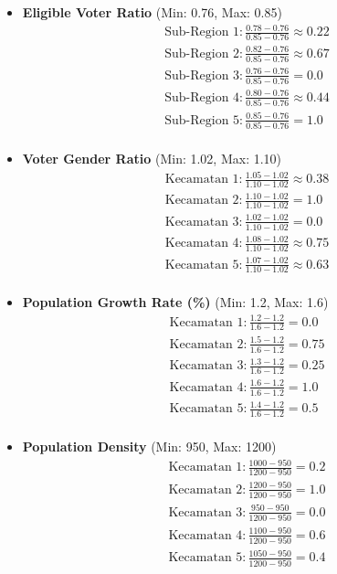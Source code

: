 \begin{itemize}
    \item \textbf{Eligible Voter Ratio} (Min: 0.76, Max: 0.85)
    \begin{align*}
        &\text{Sub-Region 1}: \frac{0.78 - 0.76}{0.85 - 0.76} \approx 0.22 \\
        &\text{Sub-Region 2}: \frac{0.82 - 0.76}{0.85 - 0.76} \approx 0.67 \\
        &\text{Sub-Region 3}: \frac{0.76 - 0.76}{0.85 - 0.76} = 0.0 \\
        &\text{Sub-Region 4}: \frac{0.80 - 0.76}{0.85 - 0.76} \approx 0.44 \\
        &\text{Sub-Region 5}: \frac{0.85 - 0.76}{0.85 - 0.76} = 1.0 \\
    \end{align*}
    
    \item \textbf{Voter Gender Ratio} (Min: 1.02, Max: 1.10)
    \begin{align*}
        &\text{Kecamatan 1}: \frac{1.05 - 1.02}{1.10 - 1.02} \approx 0.38 \\
        &\text{Kecamatan 2}: \frac{1.10 - 1.02}{1.10 - 1.02} = 1.0 \\
        &\text{Kecamatan 3}: \frac{1.02 - 1.02}{1.10 - 1.02} = 0.0 \\
        &\text{Kecamatan 4}: \frac{1.08 - 1.02}{1.10 - 1.02} \approx 0.75 \\
        &\text{Kecamatan 5}: \frac{1.07 - 1.02}{1.10 - 1.02} \approx 0.63 \\
    \end{align*}
    
    \item \textbf{Population Growth Rate (\%)} (Min: 1.2, Max: 1.6)
    \begin{align*}
        &\text{Kecamatan 1}: \frac{1.2 - 1.2}{1.6 - 1.2} = 0.0 \\
        &\text{Kecamatan 2}: \frac{1.5 - 1.2}{1.6 - 1.2} = 0.75 \\
        &\text{Kecamatan 3}: \frac{1.3 - 1.2}{1.6 - 1.2} = 0.25 \\
        &\text{Kecamatan 4}: \frac{1.6 - 1.2}{1.6 - 1.2} = 1.0 \\
        &\text{Kecamatan 5}: \frac{1.4 - 1.2}{1.6 - 1.2} = 0.5 \\
    \end{align*}
    
    \item \textbf{Population Density} (Min: 950, Max: 1200)
    \begin{align*}
        &\text{Kecamatan 1}: \frac{1000 - 950}{1200 - 950} = 0.2 \\
        &\text{Kecamatan 2}: \frac{1200 - 950}{1200 - 950} = 1.0 \\
        &\text{Kecamatan 3}: \frac{950 - 950}{1200 - 950} = 0.0 \\
        &\text{Kecamatan 4}: \frac{1100 - 950}{1200 - 950} = 0.6 \\
        &\text{Kecamatan 5}: \frac{1050 - 950}{1200 - 950} = 0.4 \\
    \end{align*}
\end{itemize}

